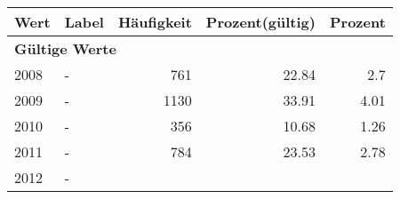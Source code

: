      \begin{longtable}{lXrrr}
     \toprule
     \textbf{Wert} & \textbf{Label} & \textbf{Häufigkeit} & \textbf{Prozent(gültig)} & \textbf{Prozent} \\
     \endhead
     \midrule
     \multicolumn{5}{l}{\textbf{Gültige Werte}}\\

     2008 &
     \multicolumn{1}{X}{ -  } &


       \num{761} &
       \num[round-mode=places,round-precision=2]{22,84} &
         \num[round-mode=places,round-precision=2]{2,7} \\

     2009 &
     \multicolumn{1}{X}{ -  } &


       \num{1130} &
       \num[round-mode=places,round-precision=2]{33,91} &
         \num[round-mode=places,round-precision=2]{4,01} \\

     2010 &
     \multicolumn{1}{X}{ -  } &


       \num{356} &
       \num[round-mode=places,round-precision=2]{10,68} &
         \num[round-mode=places,round-precision=2]{1,26} \\

     2011 &
     \multicolumn{1}{X}{ -  } &


       \num{784} &
       \num[round-mode=places,round-precision=2]{23,53} &
         \num[round-mode=places,round-precision=2]{2,78} \\

     2012 &
     \multicolumn{1}{X}{ -  } &



\end{longtable}
